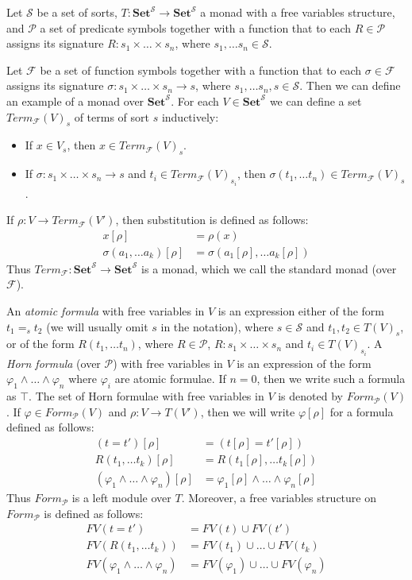 \documentclass[reqno]{amsart}
\theoremstyle{definition}
\theoremstyle{remark}
\newcommand{\cat}[1]{\mathbf{#1}}
\newcommand{\Set}{\cat{Set}}
\numberwithin{figure}{section}
\begin{document}
Let $\mathcal{S}$ be a set of sorts, $T : \Set^\mathcal{S} \to \Set^\mathcal{S}$ a monad with a free variables structure,
    and $\mathcal{P}$ a set of predicate symbols together with a function that to each $R \in \mathcal{P}$
    assigns its signature $R : s_1 \times \ldots \times s_n$, where $s_1, \ldots s_n \in \mathcal{S}$.

Let $\mathcal{F}$ be a set of function symbols together with a function that to each $\sigma \in \mathcal{F}$ assigns its signature $\sigma : s_1 \times \ldots \times s_n \to s$, where $s_1, \ldots s_n, s \in \mathcal{S}$.
Then we can define an example of a monad over $\Set^\mathcal{S}$.
For each $V \in \Set^\mathcal{S}$ we can define a set $Term_\mathcal{F}(V)_s$ of terms of sort $s$ inductively:
\begin{itemize}
\item If $x \in V_s$, then $x \in Term_\mathcal{F}(V)_s$.
\item If $\sigma : s_1 \times \ldots \times s_n \to s$ and $t_i \in Term_\mathcal{F}(V)_{s_i}$, then $\sigma(t_1, \ldots t_n) \in Term_\mathcal{F}(V)_s$.
\end{itemize}
If $\rho : V \to Term_\mathcal{F}(V')$, then substitution is defined as follows:
\begin{align*}
x[\rho] & = \rho(x) \\
\sigma(a_1, \ldots a_k)[\rho] & = \sigma(a_1[\rho], \ldots a_k[\rho])
\end{align*}
Thus $Term_\mathcal{F} : \Set^\mathcal{S} \to \Set^\mathcal{S}$ is a monad, which we call the standard monad (over $\mathcal{F}$).

An \emph{atomic formula} with free variables in $V$ is an expression either of the form $t_1 =_s t_2$ (we will usually omit $s$ in the notation),
    where $s \in \mathcal{S}$ and $t_1, t_2 \in T(V)_s$, or of the form $R(t_1, \ldots t_n)$, where $R \in \mathcal{P}$, $R : s_1 \times \ldots \times s_n$ and $t_i \in T(V)_{s_i}$.
A \emph{Horn formula} (over $\mathcal{P}$) with free variables in $V$ is an expression of the form $\varphi_1 \land \ldots \land \varphi_n$ where $\varphi_i$ are atomic formulae.
If $n = 0$, then we write such a formula as $\top$.
The set of Horn formulae with free variables in $V$ is denoted by $Form_\mathcal{P}(V)$.
If $\varphi \in Form_\mathcal{P}(V)$ and $\rho : V \to T(V')$, then we will write $\varphi[\rho]$ for a formula defined as follows:
\begin{align*}
(t = t')[\rho] & = (t[\rho] = t'[\rho]) \\
R(t_1, \ldots t_k)[\rho] & = R(t_1[\rho], \ldots t_k[\rho]) \\
(\varphi_1 \land \ldots \land \varphi_n)[\rho] & = \varphi_1[\rho] \land \ldots \land \varphi_n[\rho]
\end{align*}
Thus $Form_\mathcal{P}$ is a left module over $T$.
Moreover, a free variables structure on $Form_\mathcal{P}$ is defined as follows:
\begin{align*}
FV(t = t') & = FV(t) \cup FV(t') \\
FV(R(t_1, \ldots t_k)) & = FV(t_1) \cup \ldots \cup FV(t_k) \\
FV(\varphi_1 \land \ldots \land \varphi_n) & = FV(\varphi_1) \cup \ldots \cup FV(\varphi_n)
\end{align*}
\end{document}
